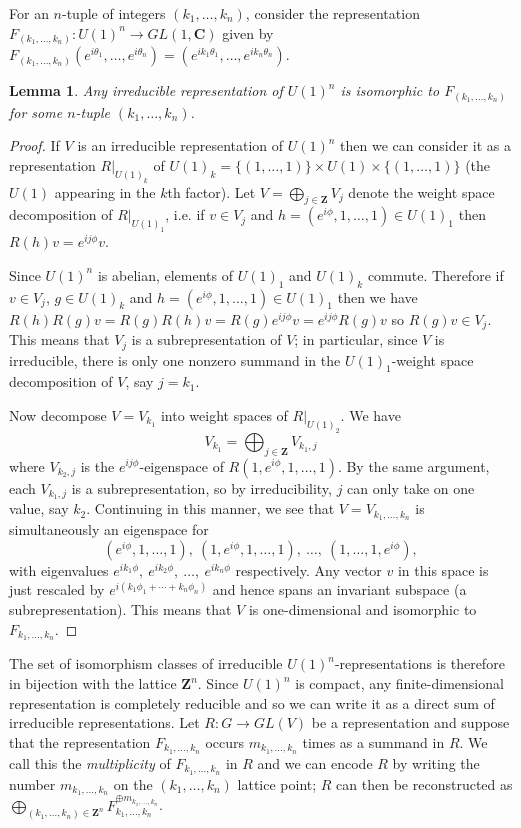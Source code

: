 \documentclass[12pt]{article}
\newcommand{\CC}{\mathbf{C}}
\newcommand{\ZZ}{\mathbf{Z}}
\newtheorem{lma}[thm]{Lemma}
\theoremstyle{definition}
\theoremstyle{check}
\theoremstyle{remark}
\theoremstyle{TheoremNum}
\begin{document}
For an $n$-tuple of integers $(k_1,\ldots,k_n)$, consider the representation $F_{(k_1,\ldots,k_n)}\colon U(1)^n\to GL(1,\CC)$ given by $F_{(k_1,\ldots,k_n)}(e^{i\theta_1},\ldots,e^{i\theta_n})=(e^{ik_1\theta_1},\ldots,e^{ik_n\theta_n})$.
\begin{lma}
Any irreducible representation of $U(1)^n$ is isomorphic to $F_{(k_1,\ldots,k_n)}$ for some $n$-tuple $(k_1,\ldots,k_n)$.
\end{lma}
\begin{proof}
If $V$ is an irreducible representation of $U(1)^n$ then we can consider it as a representation $R|_{U(1)_k}$ of $U(1)_k=\{(1,\ldots,1)\}\times U(1)\times\{(1,\ldots,1)\}$ (the $U(1)$ appearing in the $k$th factor). Let $V=\bigoplus_{j\in\ZZ}V_j$ denote the weight space decomposition of $R|_{U(1)_1}$, i.e. if $v\in V_j$ and $h=(e^{i\phi},1,\ldots,1)\in U(1)_1$ then $R(h)v=e^{ij\phi}v$.

Since $U(1)^n$ is abelian, elements of $U(1)_1$ and $U(1)_k$ commute. Therefore if $v\in V_j$, $g\in U(1)_k$ and $h=(e^{i\phi},1,\ldots,1)\in U(1)_1$ then we have $R(h)R(g)v=R(g)R(h)v=R(g)e^{ij\phi}v=e^{ij\phi}R(g)v$ so $R(g)v\in V_j$. This means that $V_j$ is a subrepresentation of $V$; in particular, since $V$ is irreducible, there is only one nonzero summand in the $U(1)_1$-weight space decomposition of $V$, say $j=k_1$.

Now decompose $V=V_{k_1}$ into weight spaces of $R|_{U(1)_2}$. We have
\[V_{k_1}=\bigoplus_{j\in\ZZ}V_{k_1,j}\]
where $V_{k_2,j}$ is the $e^{ij\phi}$-eigenspace of $R(1,e^{i\phi},1,\ldots,1)$. By the same argument, each $V_{k_1,j}$ is a subrepresentation, so by irreducibility, $j$ can only take on one value, say $k_2$. Continuing in this manner, we see that $V=V_{k_1,\ldots,k_n}$ is simultaneously an eigenspace for
\[(e^{i\phi},1,\ldots,1),\ (1,e^{i\phi},1,\ldots,1),\ \ldots,\ (1,\ldots,1,e^{i\phi}),\]
with eigenvalues $e^{ik_1\phi},\ e^{ik_2\phi},\ \ldots,\ e^{ik_n\phi}$ respectively. Any vector $v$ in this space is just rescaled by $e^{i(k_1\phi_1+\cdots+k_n\phi_n)}$ and hence spans an invariant subspace (a subrepresentation). This means that $V$ is one-dimensional and isomorphic to $F_{k_1,\ldots,k_n}$.
\end{proof}

The set of isomorphism classes of irreducible $U(1)^n$-representations is therefore in bijection with the lattice $\ZZ^n$. Since $U(1)^n$ is compact, any finite-dimensional representation is completely reducible and so we can write it as a direct sum of irreducible representations. Let $R\colon G\to GL(V)$ be a representation and suppose that the representation $F_{k_1,\ldots,k_n}$ occurs $m_{k_1,\ldots,k_n}$ times as a summand in $R$. We call this the {\em multiplicity} of $F_{k_1,\ldots,k_n}$ in $R$ and we can encode $R$ by writing the number $m_{k_1,\ldots,k_n}$ on the $(k_1,\ldots,k_n)$ lattice point; $R$ can then be reconstructed as $\bigoplus_{(k_1,\ldots,k_n)\in\ZZ^n}F_{k_1,\ldots,k_n}^{\oplus m_{k_1,\ldots,k_n}}$.
\end{document}
